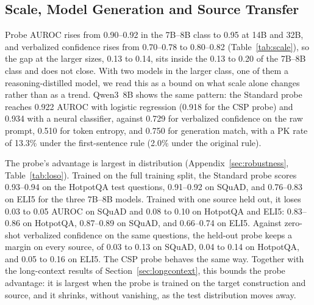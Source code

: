 \documentclass[acmsmall,screen,review]{acmart}
\begin{document}
\subsection{Scale, Model Generation and Source Transfer}
\label{sec:scale_transfer}

Probe AUROC rises from 0.90--0.92 in the 7B--8B class to 0.95 at 14B and 32B, and verbalized confidence rises from 0.70--0.78 to 0.80--0.82 (Table~\ref{tab:scale}), so the gap at the larger sizes, 0.13 to 0.14, sits inside the 0.13 to 0.20 of the 7B--8B class and does not close. With two models in the larger class, one of them a reasoning-distilled model, we read this as a bound on what scale alone changes rather than as a trend. Qwen3~8B shows the same pattern: the Standard probe reaches 0.922 AUROC with logistic regression (0.918 for the CSP probe) and 0.934 with a neural classifier, against 0.729 for verbalized confidence on the raw prompt, 0.510 for token entropy, and 0.750 for generation match, with a PK rate of 13.3\% under the first-sentence rule (2.0\% under the original rule).

The probe's advantage is largest in distribution (Appendix~\ref{sec:robustness}, Table~\ref{tab:loso}). Trained on the full training split, the Standard probe scores 0.93--0.94 on the HotpotQA test questions, 0.91--0.92 on SQuAD, and 0.76--0.83 on ELI5 for the three 7B--8B models. Trained with one source held out, it loses 0.03 to 0.05 AUROC on SQuAD and 0.08 to 0.10 on HotpotQA and ELI5: 0.83--0.86 on HotpotQA, 0.87--0.89 on SQuAD, and 0.66--0.74 on ELI5. Against zero-shot verbalized confidence on the same questions, the held-out probe keeps a margin on every source, of 0.03 to 0.13 on SQuAD, 0.04 to 0.14 on HotpotQA, and 0.05 to 0.16 on ELI5. The CSP probe behaves the same way. Together with the long-context results of Section~\ref{sec:longcontext}, this bounds the probe advantage: it is largest when the probe is trained on the target construction and source, and it shrinks, without vanishing, as the test distribution moves away.
\end{document}
